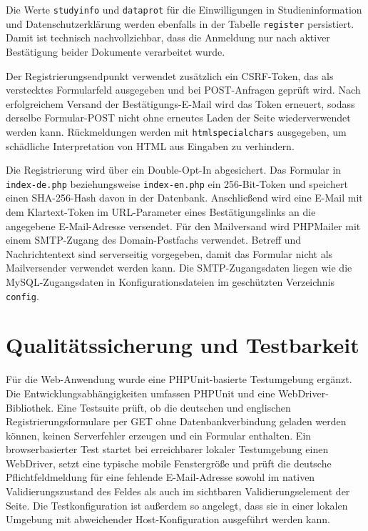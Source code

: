 Die Werte \texttt{studyinfo} und \texttt{dataprot} für die Einwilligungen in Studieninformation und Datenschutzerklärung werden ebenfalls in der Tabelle \texttt{register} persistiert. Damit ist technisch nachvollziehbar, dass die Anmeldung nur nach aktiver Bestätigung beider Dokumente verarbeitet wurde.

Der Registrierungsendpunkt verwendet zusätzlich ein CSRF-Token, das als verstecktes Formularfeld ausgegeben und bei POST-Anfragen geprüft wird. Nach erfolgreichem Versand der Bestä\-ti\-gungs-E-Mail wird das Token erneuert, sodass derselbe Formular-POST nicht ohne erneutes Laden der Seite wiederverwendet werden kann. Rückmeldungen werden mit \texttt{htmlspecialchars} ausgegeben, um schädliche Interpretation von HTML aus Eingaben zu verhindern.

Die Registrierung wird über ein Double-Opt-In abgesichert. Das Formular in \texttt{index-de.php} beziehungsweise \texttt{index-en.php} ein 256-Bit-Token und speichert einen SHA-256-Hash davon in der Datenbank. Anschließend wird eine E-Mail mit dem Klartext-Token im URL-Parameter eines Bestätigungslinks an die angegebene E-Mail-Adresse versendet. Für den Mailversand wird PHPMailer mit einem SMTP-Zugang des Do\-main-Post\-fachs verwendet. Betreff und Nachrichtentext sind serverseitig vorgegeben, damit das Formular nicht als Mailversender verwendet werden kann. Die SMTP-Zugangsdaten liegen wie die MySQL-Zugangsdaten in Konfigurationsdateien im geschützten Verzeichnis \texttt{config}.

\section{Qualitätssicherung und Testbarkeit}

Für die Web-Anwendung wurde eine PHPUnit-basierte Testumgebung ergänzt. Die Entwicklungsabhängigkeiten umfassen PHPUnit und eine WebDriver-Bibliothek. Eine Testsuite prüft, ob die deutschen und englischen Registrierungsformulare per GET ohne Datenbankverbindung geladen werden können, keinen Serverfehler erzeugen und ein Formular enthalten. Ein browserbasierter Test startet bei erreichbarer lokaler Testumgebung einen WebDriver, setzt eine typische mobile Fenstergröße und prüft die deutsche Pflichtfeldmeldung für eine fehlende E-Mail-Adresse sowohl im nativen Validierungszustand des Feldes als auch im sichtbaren Validierungselement der Seite. Die Testkonfiguration ist außerdem so angelegt, dass sie in einer lokalen Umgebung mit abweichender Host-Konfiguration ausgeführt werden kann.

